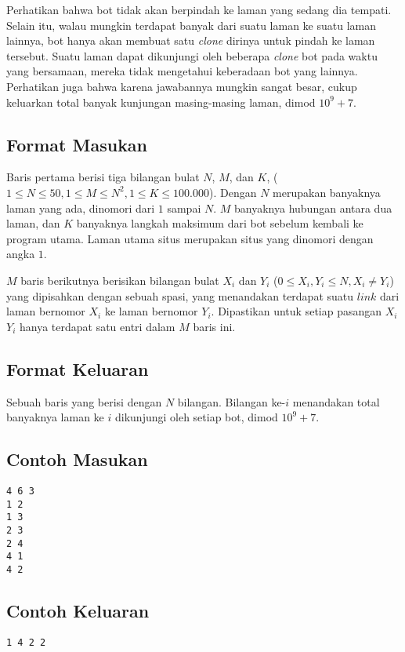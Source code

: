 \documentclass{article}
\begin{document}
Perhatikan bahwa bot tidak akan berpindah ke laman yang sedang dia tempati. Selain itu, walau mungkin terdapat banyak  dari suatu laman ke suatu laman lainnya, bot hanya akan membuat satu \textit{clone} dirinya untuk pindah ke laman tersebut. Suatu laman dapat dikunjungi oleh beberapa \textit{clone} bot pada waktu yang bersamaan, mereka tidak mengetahui keberadaan bot yang lainnya. Perhatikan juga bahwa karena jawabannya mungkin sangat besar, cukup keluarkan total banyak kunjungan masing-masing laman, dimod $10^9+7$.

\subsection*{Format Masukan}

Baris pertama berisi tiga bilangan bulat $N$, $M$, dan $K$, ($1 \leq N \leq 50, 1 \leq M \leq N^2, 1 \leq K \leq 100.000$). Dengan $N$ merupakan banyaknya laman yang ada, dinomori dari $1$ sampai $N$. $M$ banyaknya hubungan  antara dua laman, dan $K$ banyaknya langkah maksimum dari bot sebelum kembali ke program utama. Laman utama situs merupakan situs yang dinomori dengan angka $1$.

$M$ baris berikutnya berisikan bilangan bulat $X_i$ dan $Y_i$ ($0 \leq X_i, Y_i \leq N, X_i \ne Y_i$) yang dipisahkan dengan sebuah spasi, yang menandakan terdapat suatu $\textit{link}$ dari laman bernomor $X_i$ ke laman bernomor $Y_i$. Dipastikan untuk setiap pasangan $X_i$ $Y_i$ hanya terdapat satu entri dalam $M$ baris ini.

\subsection*{Format Keluaran}

Sebuah baris yang berisi dengan $N$ bilangan. Bilangan ke-$i$ menandakan total banyaknya laman ke $i$ dikunjungi oleh setiap bot, dimod $10^9+7$.
\\

\begin{multicols}{2}
\subsection*{Contoh Masukan}
\begin{lstlisting}
4 6 3
1 2
1 3
2 3
2 4
4 1
4 2
\end{lstlisting}
\columnbreak
\subsection*{Contoh Keluaran}
\begin{lstlisting}
1 4 2 2
\end{lstlisting}
\vfill
\null
\end{multicols}
\end{document}
